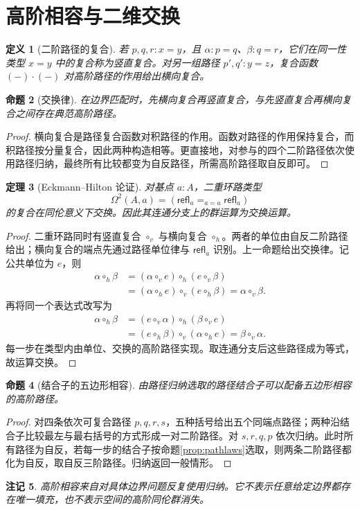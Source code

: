 \documentclass[12pt,oneside,openany,fontset=none]{ctexbook}
\theoremstyle{cn}
\newtheorem{definition}{定义}[chapter]
\newtheorem{proposition}[definition]{命题}
\newtheorem{theorem}[definition]{定理}
\newtheorem{remark}[definition]{注记}
\numberwithin{equation}{chapter}
\newcommand{\refl}{\mathsf{refl}}
\begin{document}
\section{高阶相容与二维交换}
\begin{definition}[二阶路径的复合]
若 $p,q,r:x=y$，且 $\alpha:p=q$、$\beta:q=r$，它们在同一性类型 $x=y$ 中的复合称为竖直复合。对另一组路径 $p',q':y=z$，复合函数 $(-)\cdot(-)$ 对高阶路径的作用给出横向复合。
\end{definition}
\begin{proposition}[交换律]
在边界匹配时，先横向复合再竖直复合，与先竖直复合再横向复合之间存在典范高阶路径。
\end{proposition}
\begin{proof}
横向复合是路径复合函数对积路径的作用。函数对路径的作用保持复合，而积路径按分量复合，因此两种构造相等。更直接地，对参与的四个二阶路径依次使用路径归纳，最终所有比较都变为自反路径，所需高阶路径取自反即可。
\end{proof}
\begin{theorem}[Eckmann--Hilton 论证]
对基点 $a:A$，二重环路类型
\[
\Omega^2(A,a)=(\refl_a=_{a=a}\refl_a)
\]
的复合在同伦意义下交换。因此其连通分支上的群运算为交换运算。
\end{theorem}
\begin{proof}
二重环路同时有竖直复合 $\circ_v$ 与横向复合 $\circ_h$。两者的单位由自反二阶路径给出；横向复合的端点先通过路径单位律与 $\refl_a$ 识别。上一命题给出交换律。记公共单位为 $e$，则
\begin{align*}
\alpha\circ_h\beta
&=(\alpha\circ_ve)\circ_h(e\circ_v\beta)\\
&=(\alpha\circ_he)\circ_v(e\circ_h\beta)
=\alpha\circ_v\beta.
\end{align*}
再将同一个表达式改写为
\begin{align*}
\alpha\circ_h\beta
&=(e\circ_v\alpha)\circ_h(\beta\circ_ve)\\
&=(e\circ_h\beta)\circ_v(\alpha\circ_he)
=\beta\circ_v\alpha.
\end{align*}
每一步在类型内由单位、交换的高阶路径实现。取连通分支后这些路径成为等式，故运算交换。
\end{proof}
\begin{proposition}[结合子的五边形相容]
由路径归纳选取的路径结合子可以配备五边形相容的高阶路径。
\end{proposition}
\begin{proof}
对四条依次可复合路径 $p,q,r,s$，五种括号给出五个同端点路径；两种沿结合子比较最左与最右括号的方式形成一对二阶路径。对 $s,r,q,p$ 依次归纳。此时所有路径为自反，若每一步的结合子按命题\ref{prop:pathlaws}选取，则两条二阶路径都化为自反，取自反三阶路径。归纳返回一般情形。
\end{proof}
\begin{remark}
高阶相容来自对具体边界问题反复使用归纳。它不表示任意给定边界都存在唯一填充，也不表示空间的高阶同伦群消失。
\end{remark}
\end{document}
